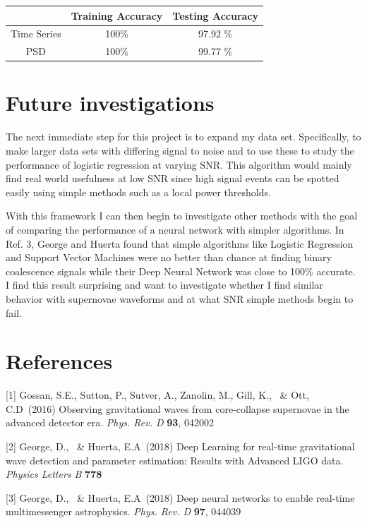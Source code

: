 \documentclass{article}
\begin{document}
\begin{center}
\begin{tabular}{ c | c | c }
  & Training Accuracy & Testing Accuracy \\ 
  \hline
  \hline
 Time Series & 100\% & 97.92 \% \\  
 \hline
 PSD & 100\% & 99.77 \%
\end{tabular}
\end{center}

\section{Future investigations}

The next immediate step for this project is to expand my data set. Specifically, to make larger data sets with differing signal to noise and to use these to study the performance of logistic regression at varying SNR. This algorithm would mainly find real world usefulness at low SNR since high signal events can be spotted easily using simple methods such as a local power thresholds. 

With this framework I can then begin to investigate other methods with the goal of comparing the performance of a neural network with simpler algorithms. In Ref. 3, George and Huerta found that simple algorithms like Logistic Regression and Support Vector Machines were no better than chance at finding binary coalescence signals while their Deep Neural Network was close to 100\% accurate. I find this result surprising and want to investigate whether I find similar behavior with supernovae waveforms and at what SNR simple methods begin to fail.

\section*{References}

\medskip

\small

[1] Gossan, S.E., Sutton, P., Sutver, A., Zanolin, M., Gill, K., \ \& Ott, C.D\ (2016) Observing gravitational waves from core-collapse supernovae in the advanced detector era. {\it Phys. Rev. D} {\bf 93}, 042002

[2] George, D., \ \& Huerta, E.A\ (2018) 
Deep Learning for real-time gravitational wave detection and parameter estimation: Results with Advanced LIGO data. {\it Physics Letters B} {\bf 778}

[3] George, D., \ \& Huerta, E.A\ (2018) Deep neural networks to enable real-time multimessenger astrophysics. {\it Phys. Rev. D} {\bf 97}, 044039
\end{document}
